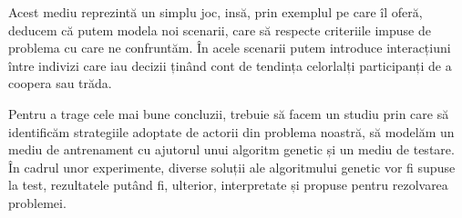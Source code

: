 Acest mediu reprezintă un simplu joc, insă, prin exemplul pe care îl oferă, deducem că putem modela noi scenarii, care să respecte criteriile impuse de problema cu care ne confruntăm. În acele scenarii putem introduce interacțiuni între indivizi care iau decizii ținând cont de tendința celorlalți participanți de a coopera sau trăda.

Pentru a trage cele mai bune concluzii, trebuie să facem un studiu prin care să identificăm strategiile adoptate de actorii din problema noastră, să modelăm un mediu de antrenament cu ajutorul unui algoritm genetic și un mediu de testare. În cadrul unor experimente, diverse soluții ale algoritmului genetic vor fi supuse la test, rezultatele putând fi, ulterior, interpretate și propuse pentru rezolvarea problemei.  


